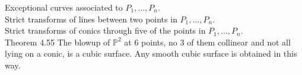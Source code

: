\documentclass[8pt]{extarticle}
\begin{document}
Exceptional curves associated to $P_1,...,P_n.$\\
Strict transforms of lines between two points in $P_1,...,P_n.$\\
Strict transforms of conics through five of the points in $P_1,...,P_n.$\\
Theorem 4.55 The blowup of $\mathbb{P}^2$ at $6$ points, no $3$ of them collinear and not all lying on a conic, is a cubic surface. Any smooth cubic surface is obtained in this way.\\
\end{document}
